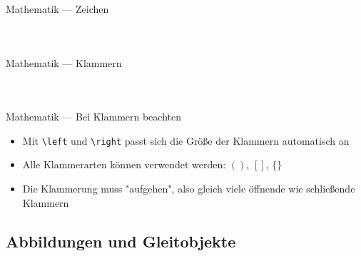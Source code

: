 \documentclass[presentation,aspectratio=169]{beamer}
\begin{document}
\begin{frame}[fragile]{Mathematik --- Zeichen}
  \begin{columns}
    \begin{column}{.4\textwidth}
      
    \end{column}
    \begin{column}{.5\textwidth}
      \inputminted{latex}{codebeispiele/math-symbols.tex}
    \end{column}
  \end{columns}
\end{frame}

\begin{frame}[fragile]{Mathematik --- Klammern}
  \begin{columns}
    \begin{column}{.3\textwidth}
      
    \end{column}
    \begin{column}{.6\textwidth}
      \inputminted{latex}{codebeispiele/math-brackets.tex}
    \end{column}
  \end{columns}
\end{frame}

\begin{frame}[fragile]{Mathematik --- Bei Klammern beachten}
  \begin{itemize}
    \item Mit \verb|\left| und \verb|\right| passt sich die Größe der Klammern automatisch an
    \item Alle Klammerarten können verwendet werden: $()$, $[]$, $\{\}$
    \item Die Klammerung muss "aufgehen", also gleich viele öffnende wie schließende Klammern
  \end{itemize}
\end{frame}

\subsection{Abbildungen und Gleitobjekte}
\end{document}
